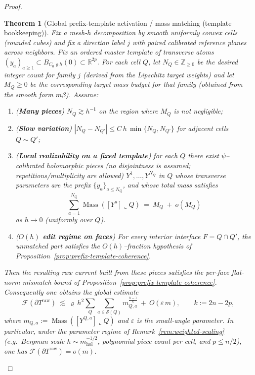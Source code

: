 \documentclass[11pt]{article}
\numberwithin{equation}{section}  %
\theoremstyle{plain}
\newtheorem{theorem}{Theorem}[section]
\theoremstyle{definition}
\theoremstyle{remark}
\newcommand{\R}{\mathbb{R}}
\newcommand{\Z}{\mathbb{Z}}
\newcommand{\mhol}{m_{\mathrm{hol}}} %
\DeclareMathOperator{\Mass}{Mass}
\begin{document}
\begin{proof}
\begin{theorem}[Global prefix-template activation / mass matching (template bookkeeping)]\label{thm:sliver-mass-matching-on-template}
Fix a mesh-$h$ decomposition by smooth uniformly convex cells (rounded cubes) and fix a direction label $j$ with paired calibrated reference planes across neighbors.
Fix an \emph{ordered} master template of transverse atoms $(y_a)_{a\ge 1}\subset B_{C_0\varrho h}(0)\subset\R^{2p}$.
For each cell $Q$, let $N_Q\in\Z_{\ge 0}$ be the desired integer count for family $j$ (derived from the Lipschitz target weights) and let
$M_Q\ge 0$ be the corresponding target mass budget for that family (obtained from the smooth form $m\beta$).
Assume:
\begin{enumerate}
\item[\textnormal{(i)}] (\textbf{Many pieces}) $N_Q\gtrsim h^{-1}$ on the region where $M_Q$ is not negligible;
\item[\textnormal{(ii)}] (\textbf{Slow variation}) $|N_Q-N_{Q'}|\le C\,h\,\min\{N_Q,N_{Q'}\}$ for adjacent cells $Q\sim Q'$;
\item[\textnormal{(iii)}] (\textbf{Local realizability on a fixed template}) for each $Q$ {there exist $\psi$--calibrated holomorphic pieces (no disjointness is assumed; repetitions/multiplicity are allowed)}
$Y^1,\dots,Y^{N_Q}$ in $Q$ whose transverse parameters are the prefix $\{y_a\}_{a\le N_Q}$, and whose total mass satisfies
\[
\sum_{a=1}^{N_Q}\Mass([Y^a]\llcorner Q)\ =\ M_Q\ +\ o(M_Q)
\]
as $h\to 0$ (uniformly over $Q$).
\item[\textnormal{(iv)}] (\textbf{$O(h)$ edit regime on faces}) For every interior interface $F=Q\cap Q'$, the unmatched part satisfies the
$O(h)$--fraction hypothesis of Proposition~\ref{prop:prefix-template-coherence}.
\end{enumerate}
Then the resulting raw current built from these pieces satisfies the per-face flat-norm mismatch bound of Proposition~\ref{prop:prefix-template-coherence}.
Consequently one obtains the global estimate
\[
\mathcal F(\partial T^{\mathrm{raw}})\ \lesssim\ \varrho\,h^2\sum_Q\sum_{a\in\mathcal S(Q)} m_{Q,a}^{\frac{k-1}{k}}\ +\ O(\varepsilon\,m),
\qquad k:=2n-2p,
\]
where $m_{Q,a}:=\Mass([Y^{Q,a}]\llcorner Q)$ and $\varepsilon$ is the small-angle parameter.
In particular, under the parameter regime of Remark~\ref{rem:weighted-scaling} (e.g.\ Bergman scale $h\sim \mhol^{-1/2}$, polynomial piece count per cell, and $p\le n/2$),
one has $\mathcal F(\partial T^{\mathrm{raw}})=o(m)$.
\end{theorem}




\end{proof}
\end{document}
